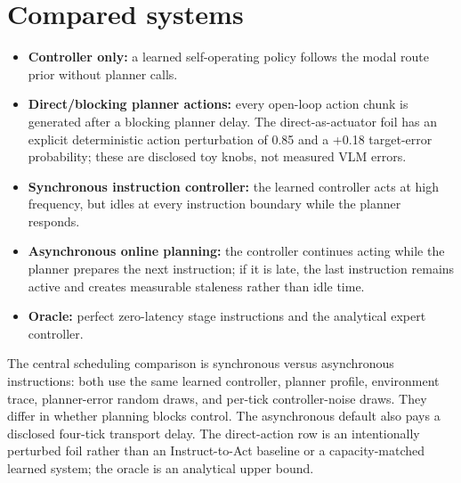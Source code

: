 \documentclass[11pt]{article}
\begin{document}
\section{Compared systems}
\begin{itemize}[leftmargin=1.5em]
\item \textbf{Controller only:} a learned self-operating policy follows the modal route prior without planner calls.
\item \textbf{Direct/blocking planner actions:} every open-loop action chunk is generated after a blocking planner delay. The direct-as-actuator foil has an explicit deterministic action perturbation of 0.85 and a +0.18 target-error probability; these are disclosed toy knobs, not measured VLM errors.
\item \textbf{Synchronous instruction controller:} the learned controller acts at high frequency, but idles at every instruction boundary while the planner responds.
\item \textbf{Asynchronous online planning:} the controller continues acting while the planner prepares the next instruction; if it is late, the last instruction remains active and creates measurable staleness rather than idle time.
\item \textbf{Oracle:} perfect zero-latency stage instructions and the analytical expert controller.
\end{itemize}

The central scheduling comparison is synchronous versus asynchronous instructions: both use the same learned controller, planner profile, environment trace, planner-error random draws, and per-tick controller-noise draws. They differ in whether planning blocks control. The asynchronous default also pays a disclosed four-tick transport delay. The direct-action row is an intentionally perturbed foil rather than an Instruct-to-Act baseline or a capacity-matched learned system; the oracle is an analytical upper bound.
\end{document}
